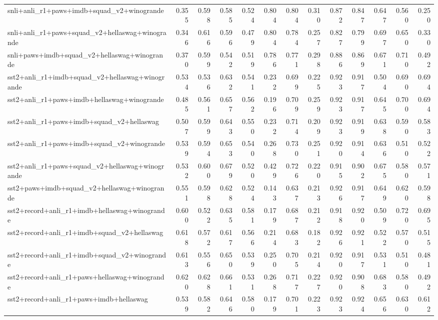 \begin{table}[t]
\begin{tabular}{lrrrrrrrrrrrr}
    snli+anli\_r1+paws+imdb+squad\_v2+winogrande & 0.355 & 0.598 & 0.585 & 0.524 & 0.804 & 0.804 & 0.310 & 0.872 & 0.847 & 0.647 & 0.560 & 0.250 \\
    snli+anli\_r1+paws+squad\_v2+hellaswag+winogrande & 0.346 & 0.616 & 0.596 & 0.479 & 0.804 & 0.784 & 0.257 & 0.827 & 0.799 & 0.697 & 0.650 & 0.330 \\
    snli+paws+imdb+squad\_v2+hellaswag+winogrande & 0.370 & 0.599 & 0.542 & 0.519 & 0.786 & 0.771 & 0.298 & 0.886 & 0.869 & 0.671 & 0.710 & 0.492 \\
    sst2+anli\_r1+imdb+squad\_v2+hellaswag+winogrande & 0.534 & 0.536 & 0.632 & 0.541 & 0.232 & 0.699 & 0.225 & 0.923 & 0.917 & 0.504 & 0.690 & 0.694 \\
    sst2+anli\_r1+paws+imdb+hellaswag+winogrande & 0.485 & 0.561 & 0.657 & 0.562 & 0.196 & 0.709 & 0.259 & 0.923 & 0.917 & 0.645 & 0.700 & 0.694 \\
    sst2+anli\_r1+paws+imdb+squad\_v2+hellaswag & 0.507 & 0.599 & 0.643 & 0.550 & 0.232 & 0.714 & 0.209 & 0.923 & 0.919 & 0.638 & 0.590 & 0.583 \\
    sst2+anli\_r1+paws+imdb+squad\_v2+winogrande & 0.539 & 0.594 & 0.653 & 0.540 & 0.268 & 0.730 & 0.251 & 0.920 & 0.914 & 0.636 & 0.510 & 0.522 \\
    sst2+anli\_r1+paws+squad\_v2+hellaswag+winogrande & 0.532 & 0.600 & 0.679 & 0.520 & 0.429 & 0.726 & 0.220 & 0.915 & 0.902 & 0.675 & 0.580 & 0.571 \\
    sst2+paws+imdb+squad\_v2+hellaswag+winogrande & 0.551 & 0.598 & 0.628 & 0.524 & 0.143 & 0.637 & 0.213 & 0.926 & 0.917 & 0.649 & 0.620 & 0.598 \\
    sst2+record+anli\_r1+imdb+hellaswag+winogrande & 0.600 & 0.522 & 0.635 & 0.581 & 0.179 & 0.687 & 0.212 & 0.918 & 0.920 & 0.509 & 0.720 & 0.695 \\
    sst2+record+anli\_r1+imdb+squad\_v2+hellaswag & 0.618 & 0.572 & 0.617 & 0.566 & 0.214 & 0.683 & 0.182 & 0.926 & 0.921 & 0.522 & 0.570 & 0.515 \\
    sst2+record+anli\_r1+imdb+squad\_v2+winogrande & 0.613 & 0.556 & 0.650 & 0.539 & 0.250 & 0.705 & 0.214 & 0.920 & 0.917 & 0.531 & 0.510 & 0.481 \\
    sst2+record+anli\_r1+paws+hellaswag+winogrande & 0.620 & 0.628 & 0.661 & 0.531 & 0.268 & 0.717 & 0.227 & 0.920 & 0.908 & 0.683 & 0.580 & 0.492 \\
    sst2+record+anli\_r1+paws+imdb+hellaswag & 0.539 & 0.582 & 0.646 & 0.580 & 0.179 & 0.701 & 0.223 & 0.923 & 0.924 & 0.656 & 0.630 & 0.612 \\

\end{tabular}
\end{table}
